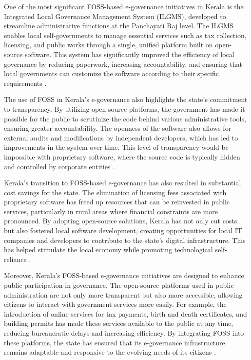 \begin{refsection}
One of the most significant FOSS-based e-governance initiatives in Kerala is the Integrated Local Governance Management System (ILGMS), developed to streamline administrative functions at the Panchayati Raj level. The ILGMS enables local self-governments to manage essential services such as tax collection, licensing, and public works through a single, unified platform built on open-source software. This system has significantly improved the efficiency of local governance by reducing paperwork, increasing accountability, and ensuring that local governments can customize the software according to their specific requirements \cite[pp.~10-11]{prabhakar2010itschool}.

The use of FOSS in Kerala’s e-governance also highlights the state’s commitment to transparency. By utilizing open-source platforms, the government has made it possible for the public to scrutinize the code behind various administrative tools, ensuring greater accountability. The openness of the software also allows for external audits and modifications by independent developers, which has led to improvements in the system over time. This level of transparency would be impossible with proprietary software, where the source code is typically hidden and controlled by corporate entities \cite[pp.~156-159]{palackal2007information}.

Kerala’s transition to FOSS-based e-governance has also resulted in substantial cost savings for the state. The elimination of licensing fees associated with proprietary software has freed up resources that can be reinvested in public services, particularly in rural areas where financial constraints are more pronounced. By adopting open-source solutions, Kerala has not only cut costs but also fostered local software development, creating opportunities for local IT companies and developers to contribute to the state's digital infrastructure. This has helped stimulate the local economy while promoting technological self-reliance \cite[pp.~45-47]{isaac2000local}.

Moreover, Kerala’s FOSS-based e-governance initiatives are designed to enhance public participation in governance. The open-source platforms used in public administration are not only more transparent but also more accessible, allowing citizens to interact with government services more easily. For example, the introduction of online services for tax payments, birth and death certificates, and building permits has made these services available to the public at any time, reducing bureaucratic delays and increasing efficiency. By integrating FOSS into these platforms, the state has ensured that its e-governance infrastructure remains adaptable and responsive to the evolving needs of its citizens \cite[pp.~23-24]{kurup2020freedom}.


\end{refsection}
